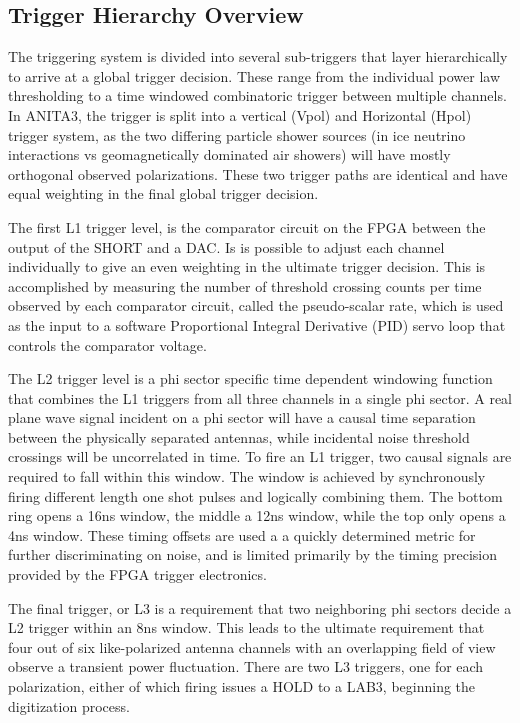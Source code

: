 	
	\subsection{Trigger Hierarchy Overview}
		The triggering system is divided into several sub-triggers that layer hierarchically to arrive at a global trigger decision.   These range from the individual power law thresholding to a time windowed combinatoric trigger between multiple channels.  In ANITA3, the trigger is split into a vertical (Vpol) and Horizontal (Hpol) trigger system, as the two differing particle shower sources (in ice neutrino interactions vs geomagnetically dominated air showers) will have mostly orthogonal observed polarizations.  These two trigger paths are identical and have equal weighting in the final global trigger decision.  
		
		The first L1 trigger level, is the comparator circuit on the FPGA between the output of the SHORT and a DAC. Is is possible to adjust each channel individually to give an even weighting in the ultimate trigger decision.  This is accomplished by measuring the number of threshold crossing counts per time observed by each comparator circuit, called the pseudo-scalar rate, which is used as the input to a software Proportional Integral Derivative (PID) servo loop that controls the comparator voltage.
		
		The L2 trigger level is a phi sector specific time dependent windowing function that combines the L1 triggers from all three channels in a single phi sector.  A real plane wave signal incident on a phi sector will have a causal time separation between the physically separated antennas, while incidental noise threshold crossings will be uncorrelated in time.  To fire an L1 trigger, two causal signals are required to fall within this window.  The window is achieved by synchronously firing different length one shot pulses and logically combining them.  The bottom ring opens a 16ns window, the middle a 12ns window, while the top only opens a 4ns window. These timing offsets are used a a quickly determined metric for further discriminating on noise, and is limited primarily by the timing precision provided by the FPGA trigger electronics.  
		
		The final trigger, or L3 is a requirement that two neighboring phi sectors decide a L2 trigger within an 8ns window.  This leads to the ultimate requirement that four out of six like-polarized antenna channels with an overlapping field of view observe a transient power fluctuation.  There are two L3 triggers, one for each polarization, either of which firing issues a HOLD to a LAB3, beginning the digitization process.
		

